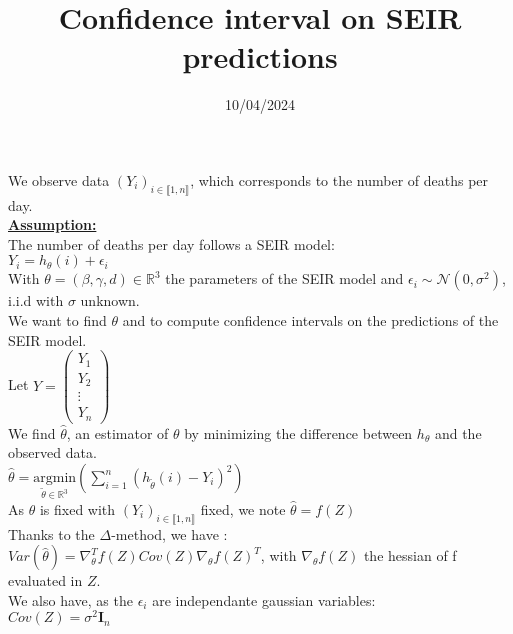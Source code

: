 \documentclass{article}
\title{Confidence interval on SEIR predictions}
\author{}
\date{10/04/2024}
\begin{document}
\maketitle


We observe data $(Y_i)_{i \in \llbracket 1, n  \rrbracket }$, which corresponds to the number of deaths per day. \\[0.5cm]

\underline{\textbf{Assumption:}}\\[0.5cm]
The number of deaths per day follows a SEIR model: \\
$Y_i = h_\theta(i) + \epsilon_i$\\

With $\theta = (\beta , \gamma , d ) \in \mathbb{R} ^3$ the parameters of the SEIR model and $\epsilon_i \sim \mathcal{N}(0, \sigma^2)$, i.i.d with $\sigma$ unknown.\\[0.5cm]

We want to find $\theta$ and to compute confidence intervals on the predictions of the SEIR model. \\[0.5cm]

Let $Y = 
\begin{pmatrix}
    Y_1 \\
    Y_2 \\
    \vdots \\
    Y_n
\end{pmatrix} $ \\[0.2cm]


We find $\hat{\theta}$, an estimator of $\theta$ by minimizing the difference between $h_\theta$ and the observed data.\\

$\hat{\theta}= \underset{\tilde{\theta} \in \mathbb{R} ^3}{\text{argmin}} \left(\sum_{i=1}^{n} (h_{\tilde{\theta}}(i) - Y_i)^2\right) $\\
As $\theta$ is fixed with $(Y_i)_{i \in \llbracket 1 , n  \rrbracket}$ fixed, we note $\hat{\theta} = f(Z)$\\

Thanks to the $\Delta$-method, we have : \\

$Var(\hat{\theta}) = \nabla_{\theta} ^T f(Z) Cov(Z) \nabla_{\theta} f(Z)^T$, with $\nabla_{\theta} f(Z)$ the hessian of f evaluated in $Z$. \\

We also have, as the $\epsilon_i$ are independante gaussian variables: \\[0.2cm]
$Cov(Z) = \sigma ^2 \mathbf{I}_n$\\
\end{document}

